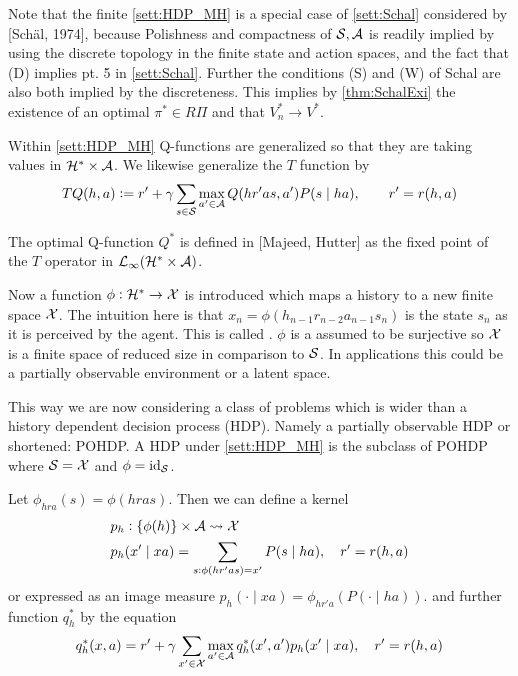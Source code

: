 \begin{rem}
  Note that the finite \cref{sett:HDP_MH} is a special case of
  \cref{sett:Schal} considered by [Schäl, 1974],
  because Polishness and compactness of $\mathcal{S}, \mathcal{A}$ is readily
  implied by using the discrete topology in the finite state and action
  spaces, and the fact that (D) implies pt. 5 in \cref{sett:Schal}.
  Further the conditions (S) and (W) of Schal are also both implied by
  the discreteness.
  This implies by \cref{thm:SchalExi} the existence of an optimal
  $\pi^* \in R\Pi$ and that $V^*_n \to V^*$.
\end{rem}

Within \cref{sett:HDP_MH} Q-functions are generalized so that
they are taking values in $\mathcal{H}^* \times \mathcal{A}$.
We likewise generalize the $T$ function by
\begin{equation}
  TQ(h, a) \vcentcolon= r' +
  \gamma \sum_{s\in\mathcal{S}} \max_{a' \in \mathcal{A}} Q(hr'as, a') P(s \mid ha),
  \qquad r' = r(h, a)
  \label{eq:MH_Q_def}
\end{equation}

The optimal Q-function $Q^*$ is defined in [Majeed, Hutter] as
the fixed point of the $T$ operator in
$\mathcal{L}_\infty(\mathcal{H}^* \times \mathcal{A})$.

Now a function $\phi : \mathcal{H}^* \to \mathcal{X}$ is introduced
which maps a history to a new finite space $\mathcal{X}$.
The intuition here is that $x_n = \phi(h_{n-1} r_{n-2} a_{n-1} s_n)$ is the
state $s_n$ as it is perceived by the agent.
This is called .
$\phi$ is a assumed to be surjective so $\mathcal{X}$ is a finite space of
reduced size in comparison to $\mathcal{S}$.
In applications this could be a partially observable environment
or a latent space.

This way we are now considering a class of problems
which is wider than a 
history dependent decision process (HDP).
Namely a partially observable HDP or shortened: POHDP.
A HDP under \cref{sett:HDP_MH} is the subclass of POHDP where
$\mathcal{S} = \mathcal{X}$ and $\phi = \text{id}_\mathcal{S}$.

Let $\phi_{hra}(s) = \phi(hras)$. Then we can define a kernel
\begin{align*} p_h & : \{\phi(h)\} \times \mathcal{A} \leadsto \mathcal{X}
  \\ p_h & (x' \mid xa)
  = \sum_{s:\phi(hr'as)=x'} P(s \mid ha), \quad r'=r(h,a)
\end{align*}
or expressed as an image measure
$p_h(\cdot \mid xa) = \phi_{hr'a}(P(\cdot \mid ha))$.
and further function $q_h^*$ by the equation
\begin{equation}
  q_h^*(x, a) = r' + \gamma \sum_{x' \in \mathcal{X}} 
  \max_{a' \in \mathcal{A}} q^*_h(x', a')
  p_h(x' \mid xa), \quad r'=r(h,a)
  \label{eq:MH_q_def}
\end{equation}

